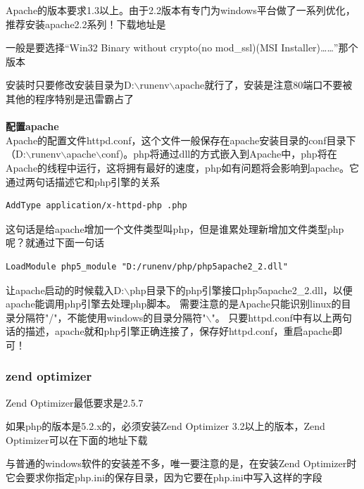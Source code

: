 \documentclass{article}
\begin{document}
Apache的版本要求1.3以上。由于2.2版本有专门为windows平台做了一系列优化，推荐安装apache2.2系列！下载地址是


一般是要选择“Win32 Binary without crypto(no mod\_ssl)(MSI Installer)……”那个版本

安装时只要修改安装目录为D:$\backslash$runenv$\backslash$apache就行了，安装是注意80端口不要被其他的程序特别是迅雷霸占了 

\paragraph{}\textbf{配置apache}\\

Apache的配置文件httpd.conf，这个文件一般保存在apache安装目录的conf目录下（D:$\backslash$runenv$\backslash$apache$\backslash$conf)。php将通过dll的方式嵌入到Apache中，php将在Apache的线程中运行，这将拥有最好的速度，php如有问题将会影响到apache。它通过两句话描述它和php引擎的关系

\begin{verbatim}
AddType application/x-httpd-php .php
\end{verbatim}
这句话是给apache增加一个文件类型叫php，但是谁累处理新增加文件类型php呢？就通过下面一句话 

\begin{verbatim}
LoadModule php5_module "D:/runenv/php/php5apache2_2.dll"
\end{verbatim}
让apache启动的时候载入D:$\backslash$php目录下的php引擎接口php5apache2\_2.dll，以便apache能调用php引擎去处理php脚本。
需要注意的是Apache只能识别linux的目录分隔符"/"，不能使用windows的目录分隔符"$\backslash$"。 
只要httpd.conf中有以上两句话的描述，apache就和php引擎正确连接了，保存好httpd.conf，重启apache即可！

\hypertarget{toc11}{}
\subsubsection{zend optimizer}
Zend Optimizer最低要求是2.5.7

如果php的版本是5.2.x的，必须安装Zend Optimizer 3.2以上的版本，Zend Optimizer可以在下面的地址下载


与普通的windows软件的安装差不多，唯一要注意的是，在安装Zend Optimizer时它会要求你指定php.ini的保存目录，因为它要在php.ini中写入这样的字段
\end{document}
